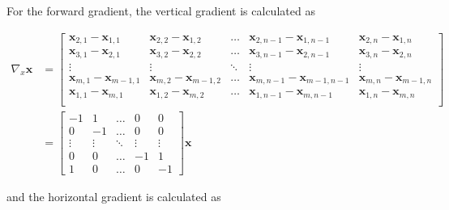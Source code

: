 \documentclass[12pt]{article}
\begin{document}
For the forward gradient, the vertical gradient is calculated as

\begin{equation}
  \begin{aligned}
  \nabla_{x} \mathbf{x} &= \begin{bmatrix}
    \mathbf{x}_{2,1} - \mathbf{x}_{1,1} & \mathbf{x}_{2, 2} - \mathbf{x}_{1, 2} & \ldots & \mathbf{x}_{2, n-1} - \mathbf{x}_{1, n-1} & \mathbf{x}_{2, n} - \mathbf{x}_{1, n} \\
    \mathbf{x}_{3,1} - \mathbf{x}_{2,1} & \mathbf{x}_{3, 2} - \mathbf{x}_{2, 2} & \ldots & \mathbf{x}_{3, n-1} - \mathbf{x}_{2, n-1} & \mathbf{x}_{3, n} - \mathbf{x}_{2, n}  \\
    \vdots & \vdots & \ddots & \vdots & \vdots \\
    \mathbf{x}_{m,1} - \mathbf{x}_{m-1,1} & \mathbf{x}_{m, 2} - \mathbf{x}_{m-1, 2} & \ldots & \mathbf{x}_{m, n-1} - \mathbf{x}_{m-1, n-1} & \mathbf{x}_{m, n} - \mathbf{x}_{m-1, n} \\
    \mathbf{x}_{1, 1} - \mathbf{x}_{m, 1} & \mathbf{x}_{1, 2} - \mathbf{x}_{m, 2} & \ldots & \mathbf{x}_{1, n-1} - \mathbf{x}_{m, n-1} & \mathbf{x}_{1, n} - \mathbf{x}_{m, n} \\
  \end{bmatrix} \\
  &= \begin{bmatrix}
    -1 & 1 & \ldots & 0 & 0 \\
    0 & -1 & \ldots & 0 & 0 \\
     \vdots & \vdots & \ddots & \vdots & \vdots \\
    0 & 0 & \ldots & -1 & 1 \\
    1 & 0 & \ldots & 0 & -1
    \end{bmatrix} \mathbf{x}
  \end{aligned}
\end{equation}

and the horizontal gradient is calculated as
\end{document}

